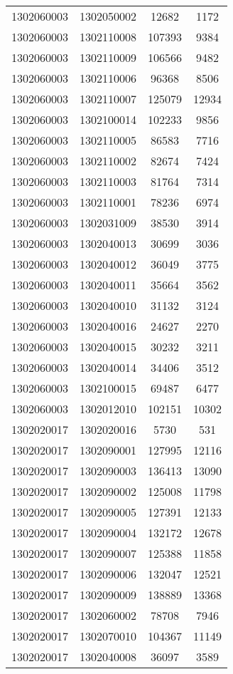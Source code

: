 \begin{longtable}{llcc}
1302060003 & 1302050002 & 12682 & 1172\\
1302060003 & 1302110008 & 107393 & 9384\\
1302060003 & 1302110009 & 106566 & 9482\\
1302060003 & 1302110006 & 96368 & 8506\\
1302060003 & 1302110007 & 125079 & 12934\\
1302060003 & 1302100014 & 102233 & 9856\\
1302060003 & 1302110005 & 86583 & 7716\\
1302060003 & 1302110002 & 82674 & 7424\\
1302060003 & 1302110003 & 81764 & 7314\\
1302060003 & 1302110001 & 78236 & 6974\\
1302060003 & 1302031009 & 38530 & 3914\\
1302060003 & 1302040013 & 30699 & 3036\\
1302060003 & 1302040012 & 36049 & 3775\\
1302060003 & 1302040011 & 35664 & 3562\\
1302060003 & 1302040010 & 31132 & 3124\\
1302060003 & 1302040016 & 24627 & 2270\\
1302060003 & 1302040015 & 30232 & 3211\\
1302060003 & 1302040014 & 34406 & 3512\\
1302060003 & 1302100015 & 69487 & 6477\\
1302060003 & 1302012010 & 102151 & 10302\\
1302020017 & 1302020016 & 5730 & 531\\
1302020017 & 1302090001 & 127995 & 12116\\
1302020017 & 1302090003 & 136413 & 13090\\
1302020017 & 1302090002 & 125008 & 11798\\
1302020017 & 1302090005 & 127391 & 12133\\
1302020017 & 1302090004 & 132172 & 12678\\
1302020017 & 1302090007 & 125388 & 11858\\
1302020017 & 1302090006 & 132047 & 12521\\
1302020017 & 1302090009 & 138889 & 13368\\
1302020017 & 1302060002 & 78708 & 7946\\
1302020017 & 1302070010 & 104367 & 11149\\
1302020017 & 1302040008 & 36097 & 3589\\

\end{longtable}

